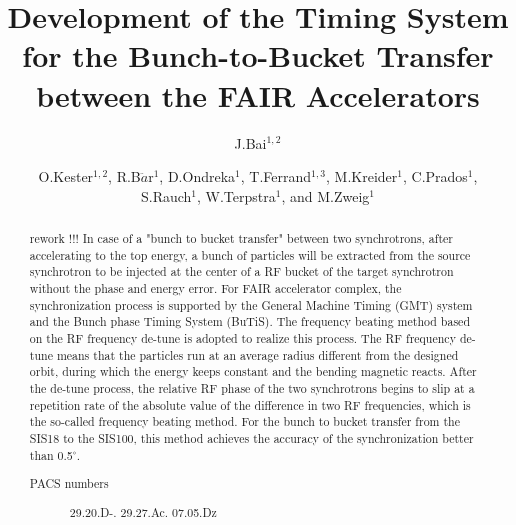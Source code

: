 \documentclass[%
 reprint,
 amsmath,amssymb,
 aps,
]{revtex4-1}
\begin{document}

\title{Development of the Timing System for the Bunch-to-Bucket Transfer between the FAIR Accelerators}%

\author{J.Bai$^{1,2}$}
\author{O.Kester$^{1,2}$, R.B$\ddot{a}$r$^{1}$, D.Ondreka$^{1}$, T.Ferrand$^{1,3}$, M.Kreider$^{1}$, C.Prados$^{1}$,\\ S.Rauch$^{1}$, W.Terpstra$^{1}$, and M.Zweig$^{1}$}%

%


\begin{abstract} rework !!! In case of a "bunch to bucket transfer" between two synchrotrons, after accelerating to the top energy, a bunch of particles will be extracted from the source synchrotron to be injected at the center of a RF bucket of the target synchrotron without the phase and energy error. For FAIR accelerator complex, the synchronization process is supported by the General Machine Timing (GMT) system and the Bunch phase Timing System (BuTiS). The frequency beating method based on the RF frequency de-tune is adopted to realize this process. The RF frequency de-tune means that the particles run at an average radius different from the designed orbit, during which the energy keeps constant and the bending magnetic reacts. After the de-tune process, the relative RF phase of the two synchrotrons begins to slip at a repetition rate of the absolute value of the difference in two RF frequencies, which is the so-called frequency beating method. For the bunch to bucket transfer from the SIS18 to the SIS100, this method achieves the accuracy of the synchronization better than 0.5$^\circ$.

\begin{description}
\item[PACS numbers]
29.20.D-. 29.27.Ac. 07.05.Dz

\end{description}
\end{abstract}
\end{document}
